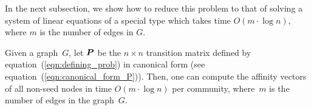 In the next subsection, we show 
how to reduce this problem to that of solving a system of linear equations 
of a special type which takes time $O(m \cdot \log n)$, where $m$
is the number of edges in $G$.
\begin{theorem}\label{theorem:computing_NR}
Given a graph~$G$, let $\boldsymbol{P}$ be the $n \times n$ transition matrix 
defined by equation~(\ref{eqn:defining_prob}) in canonical form 
(see equation~(\ref{eqn:canonical_form_P})). Then, one can compute 
the affinity vectors of all non-seed nodes in time $O(m \cdot \log n)$ per community, 
where~$m$ is the number of edges in the graph~$G$.
\end{theorem}  



